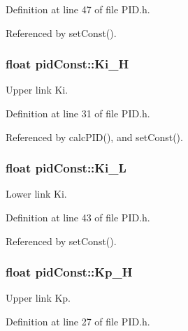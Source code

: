 Definition at line 47 of file P\-I\-D.\-h.



Referenced by set\-Const().

\hypertarget{structpid_const_a2d06f9407c1fd682baa8519e5744384a}{
\subsubsection[{Ki\-\_\-\-H}]{\setlength{\rightskip}{0pt plus 5cm}float pid\-Const\-::\-Ki\-\_\-\-H}}\label{structpid_const_a2d06f9407c1fd682baa8519e5744384a}


Upper link Ki. 



Definition at line 31 of file P\-I\-D.\-h.



Referenced by calc\-P\-I\-D(), and set\-Const().

\hypertarget{structpid_const_a073fd5fd7eccdab0c8c7d5ad15bcb4c0}{
\subsubsection[{Ki\-\_\-\-L}]{\setlength{\rightskip}{0pt plus 5cm}float pid\-Const\-::\-Ki\-\_\-\-L}}\label{structpid_const_a073fd5fd7eccdab0c8c7d5ad15bcb4c0}


Lower link Ki. 



Definition at line 43 of file P\-I\-D.\-h.



Referenced by set\-Const().

\hypertarget{structpid_const_ae2c7d62f4fd919c89233a39e1a84b2db}{
\subsubsection[{Kp\-\_\-\-H}]{\setlength{\rightskip}{0pt plus 5cm}float pid\-Const\-::\-Kp\-\_\-\-H}}\label{structpid_const_ae2c7d62f4fd919c89233a39e1a84b2db}


Upper link Kp. 



Definition at line 27 of file P\-I\-D.\-h.



